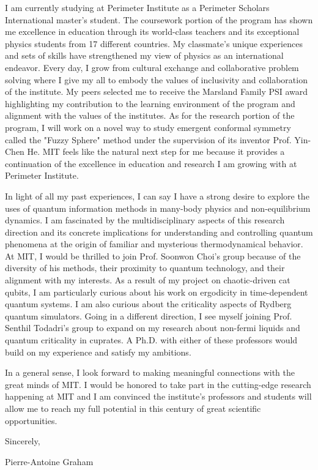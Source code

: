 \documentclass[12pt]{article}
\begin{document}
I am currently studying at Perimeter Institute as a Perimeter Scholars International master's student. The coursework portion of the program has shown me excellence in education through its world-class teachers and its exceptional physics students from 17 different countries. My classmate's unique experiences and sets of skills have strengthened my view of physics as an international endeavor. Every day, I grow from cultural exchange and collaborative problem solving where I give my all to embody the values of inclusivity and collaboration of the institute. My peers selected me to receive the Marsland Family PSI award highlighting my contribution to the learning environment of the program and alignment with the values of the institutes. As for the research portion of the program, I will work on a novel way to study emergent conformal symmetry called the "Fuzzy Sphere" method under the supervision of its inventor Prof. Yin-Chen He. MIT feels like the natural next step for me because it provides a continuation of the excellence in education and research I am growing with at Perimeter Institute.  

In light of all my past experiences, I can say I have a strong desire to explore the uses of quantum information methods in many-body physics and non-equilibrium dynamics. I am fascinated by the multidisciplinary aspects of this research direction and its concrete implications for understanding and controlling quantum phenomena at the origin of familiar and mysterious thermodynamical behavior. At MIT, I would be thrilled to join Prof. Soonwon Choi's group because of the diversity of his methods, their proximity to quantum technology, and their alignment with my interests. As a result of my project on chaotic-driven cat qubits, I am particularly curious about his work on ergodicity in time-dependent quantum systems. I am also curious about the criticality aspects of Rydberg quantum simulators. Going in a different direction, I see myself joining Prof. Senthil Todadri's group to expand on my research about non-fermi liquids and quantum criticality in cuprates. A Ph.D. with either of these professors would build on my experience and satisfy my ambitions.

In a general sense, I look forward to making meaningful connections with the great minds of MIT. I would be honored to take part in the cutting-edge research happening at MIT and I am convinced the institute's professors and students will allow me to reach my full potential in this century of great scientific opportunities.

Sincerely,

Pierre-Antoine Graham
\end{document}
